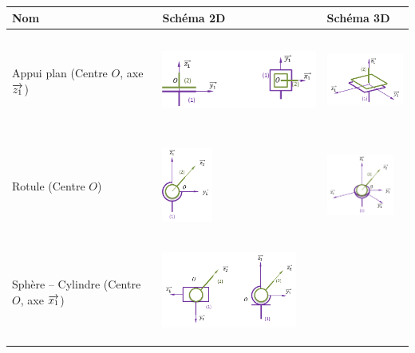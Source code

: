 \documentclass[10pt,oneside]{article}
\begin{document}
\begin{center}
\begin{tabular}{|m{}|p{}|p{}|}
\hline
Nom &  Schéma 2D & Schéma 3D \\
\hline
Appui plan
(Centre $O$, axe $\overrightarrow{z_1}$)&
\begin{center}
\includegraphics[height=2.5cm]{png/plan_2d}
\end{center}
&
\begin{center}
\includegraphics[height=2cm]{png/plan_3d}
\end{center}
\\
\hline
Rotule
(Centre $O$)
&
\begin{center}
\includegraphics[height=2.5cm]{png/rotule_2d}
\end{center}
&
\begin{center}
\includegraphics[height=2cm]{png/rotule_3d}
\end{center}\\\hline
Sphère -- Cylindre
(Centre $O$, axe $\overrightarrow{x_1}$)&
\begin{center}
\includegraphics[height=2.5cm]{png/annulaire_2d}
\end{center}

\end{tabular}
\end{center}
\end{document}
